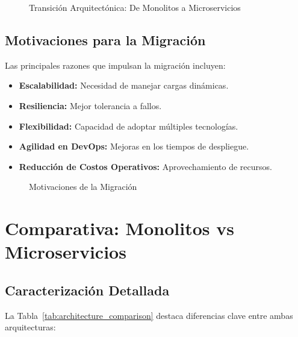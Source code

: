 \documentclass[conference]{IEEEtran}
\begin{document}
\begin{figure}[htbp]
\centering
{}
\caption{Transición Arquitectónica: De Monolitos a Microservicios}
\label{fig:architectural_transition}
\end{figure}

\subsection{Motivaciones para la Migración}
Las principales razones que impulsan la migración incluyen:

\begin{itemize}
    \item \textbf{Escalabilidad:} Necesidad de manejar cargas dinámicas.
    \item \textbf{Resiliencia:} Mejor tolerancia a fallos.
    \item \textbf{Flexibilidad:} Capacidad de adoptar múltiples tecnologías.
    \item \textbf{Agilidad en DevOps:} Mejoras en los tiempos de despliegue.
    \item \textbf{Reducción de Costos Operativos:} Aprovechamiento de recursos.
\end{itemize}

\begin{figure}[htbp]
\centering
{}
\caption{Motivaciones de la Migración}
\label{fig:migration_motives}
\end{figure}

\section{Comparativa: Monolitos vs Microservicios}

\subsection{Caracterización Detallada}
La Tabla~\ref{tab:architecture_comparison} destaca diferencias clave entre ambas arquitecturas:
\end{document}
